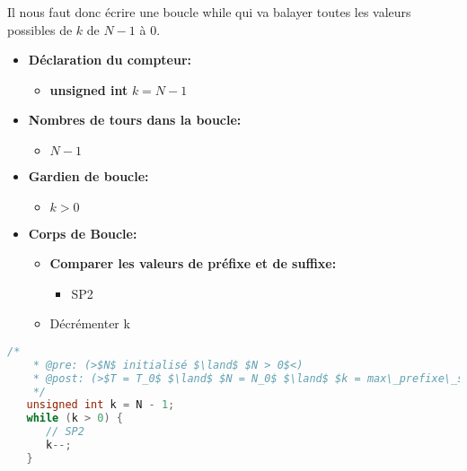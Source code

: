 \vspace{0.4cm}
Il nous faut donc écrire une boucle while qui va balayer toutes les valeurs
possibles de $k$ de $N-1$ à 0.
\begin{itemize}
   \item \textbf{Déclaration du compteur:}
      \begin{itemize}
         \item \textbf{unsigned int} $k = N-1$
      \end{itemize}
   \item \textbf{Nombres de tours dans la boucle:}
      \begin{itemize}
         \item $N-1$
      \end{itemize}
   \item \textbf{Gardien de boucle:}
      \begin{itemize}
         \item $k > 0$
      \end{itemize}
   \item \textbf{Corps de Boucle:}
   \begin{itemize}
      \item \textbf{Comparer les valeurs de préfixe et de suffixe:}
      \begin{itemize}
         \item SP2
      \end{itemize}
      \item Décrémenter k
   \end{itemize}
\end{itemize}

\begin{lstlisting}[language=C, caption=SP1]
   /*
    * @pre: (>$N$ initialisé $\land$ $N > 0$<)
    * @post: (>$T = T_0$ $\land$ $N = N_0$ $\land$ $k = max\_prefixe\_suffixe(*T,k,N)$ $\land$ $k \geq 0$<)
    */
   unsigned int k = N - 1;
   while (k > 0) {
      // SP2
      k--;
   }
\end{lstlisting}

